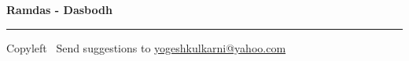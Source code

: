 %



\raggedright
\footnotesize


\begin{center}
\Large{\textbf{Ramdas - Dasbodh}}  
\end{center}


\begin{multicols}{3}

\end{multicols}

\rule{\linewidth}{0.25pt}
\scriptsize
Copyleft \textcopyleft\  Send suggestions to 
\href{http://www.yogeshkulkarni.com}{yogeshkulkarni@yahoo.com}


